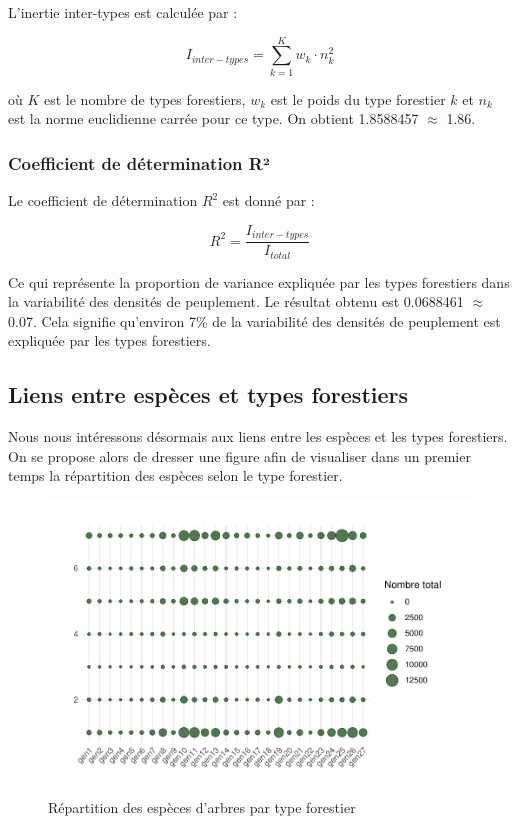 \documentclass[
]{article}
\begin{document}
L'inertie inter-types est calculée par :

\[
I_{inter-types} = \sum_{k=1}^{K} w_{k} \cdot n_{k}^{2}
\]

où \(K\) est le nombre de types forestiers, \(w_{k}\) est le poids du
type forestier \(k\) et \(n_{k}\) est la norme euclidienne carrée pour
ce type. On obtient 1.8588457 \(\approx\) 1.86.

\hypertarget{coefficient-de-duxe9termination-ruxb2}{%
\subsubsection{Coefficient de détermination
R²}\label{coefficient-de-duxe9termination-ruxb2}}

Le coefficient de détermination \(R^2\) est donné par :

\[
R^2 = \frac{I_{inter-types}}{I_{total}} 
\]

Ce qui représente la proportion de variance expliquée par les types
forestiers dans la variabilité des densités de peuplement. Le résultat
obtenu est 0.0688461 \(\approx\) 0.07. Cela signifie qu'environ 7\% de
la variabilité des densités de peuplement est expliquée par les types
forestiers.

\hypertarget{liens-entre-espuxe8ces-et-types-forestiers}{%
\subsection{Liens entre espèces et types
forestiers}\label{liens-entre-espuxe8ces-et-types-forestiers}}

Nous nous intéressons désormais aux liens entre les espèces et les types
forestiers. On se propose alors de dresser une figure afin de visualiser
dans un premier temps la répartition des espèces selon le type
forestier.

\begin{figure}[H]

{\centering \includegraphics{EL_MAZZOUJI_Wahel_GILLET_Louison_ADM_DM1_files/figure-latex/especes_forest-1} 

}

\caption{Répartition des espèces d'arbres par type forestier}\label{fig:especes_forest}
\end{figure}
\end{document}
